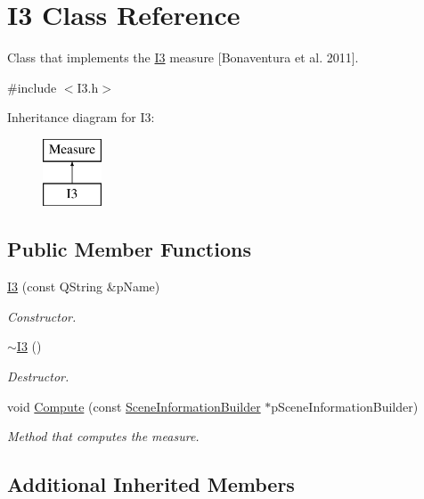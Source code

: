 \hypertarget{class_i3}{\section{I3 Class Reference}
\label{class_i3}
}


Class that implements the \hyperlink{class_i3}{I3} measure \mbox{[}Bonaventura et al. 2011\mbox{]}.  




{\ttfamily \#include $<$I3.\+h$>$}

Inheritance diagram for I3\+:\begin{figure}[H]
\begin{center}
\leavevmode
\includegraphics[height=2.000000cm]{class_i3}
\end{center}
\end{figure}
\subsection*{Public Member Functions}
\begin{DoxyCompactItemize}
\item 
\hyperlink{class_i3_af5c71349642752cd9c1ed45cb082dbd4}{I3} (const Q\+String \&p\+Name)
\begin{DoxyCompactList}\small\item\em Constructor. \end{DoxyCompactList}\item 
\hyperlink{class_i3_a8efa353b5eec8688b27a4ffb56a40dd2}{$\sim$\+I3} ()
\begin{DoxyCompactList}\small\item\em Destructor. \end{DoxyCompactList}\item 
void \hyperlink{class_i3_a7a0d7ed59c574c5009276ca067374f7d}{Compute} (const \hyperlink{class_scene_information_builder}{Scene\+Information\+Builder} $\ast$p\+Scene\+Information\+Builder)
\begin{DoxyCompactList}\small\item\em Method that computes the measure. \end{DoxyCompactList}\end{DoxyCompactItemize}
\subsection*{Additional Inherited Members}


